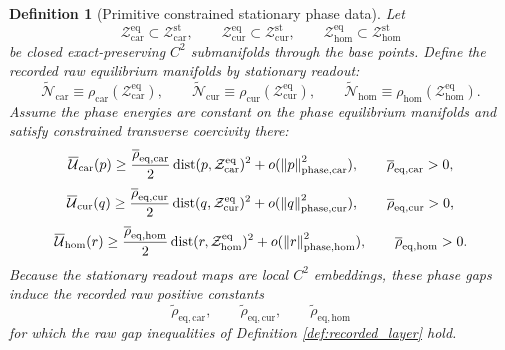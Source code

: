 \documentclass[11pt]{article}
\newcommand{\TensorRawEqManifold}{\widetilde{\mathcal N}_{\mathrm{car}}}
\newcommand{\CurRawEqManifold}{\widetilde{\mathcal N}_{\mathrm{cur}}}
\newcommand{\HomRawEqManifold}{\widetilde{\mathcal N}_{\mathrm{hom}}}
\newcommand{\RawCarGap}{\widetilde\rho_{\mathrm{eq,car}}}
\newcommand{\RawCurGap}{\widetilde\rho_{\mathrm{eq,cur}}}
\newcommand{\RawHomGap}{\widetilde\rho_{\mathrm{eq,hom}}}
\newcommand{\TensorPhaseRead}{\rho_{\mathrm{car}}}
\newcommand{\CurPhaseRead}{\rho_{\mathrm{cur}}}
\newcommand{\HomPhaseRead}{\rho_{\mathrm{hom}}}
\newcommand{\TensorPhaseEnergy}{\overline{\mathcal U}_{\mathrm{car}}}
\newcommand{\CurPhaseEnergy}{\overline{\mathcal U}_{\mathrm{cur}}}
\newcommand{\HomPhaseEnergy}{\overline{\mathcal U}_{\mathrm{hom}}}
\newcommand{\TensorStationaryManifold}{\mathcal Z_{\mathrm{car}}^{\mathrm{st}}}
\newcommand{\CurStationaryManifold}{\mathcal Z_{\mathrm{cur}}^{\mathrm{st}}}
\newcommand{\HomStationaryManifold}{\mathcal Z_{\mathrm{hom}}^{\mathrm{st}}}
\newcommand{\TensorPhaseEqManifold}{\mathcal Z_{\mathrm{car}}^{\mathrm{eq}}}
\newcommand{\CurPhaseEqManifold}{\mathcal Z_{\mathrm{cur}}^{\mathrm{eq}}}
\newcommand{\HomPhaseEqManifold}{\mathcal Z_{\mathrm{hom}}^{\mathrm{eq}}}
\newcommand{\PhaseCarGap}{\overline\rho_{\mathrm{eq,car}}}
\newcommand{\PhaseCurGap}{\overline\rho_{\mathrm{eq,cur}}}
\newcommand{\PhaseHomGap}{\overline\rho_{\mathrm{eq,hom}}}
\newtheorem{definition}{Definition}
\begin{document}
\begin{definition}[Primitive constrained stationary phase data]
Let
\[
\TensorPhaseEqManifold\subset\TensorStationaryManifold,\qquad
\CurPhaseEqManifold\subset\CurStationaryManifold,\qquad
\HomPhaseEqManifold\subset\HomStationaryManifold
\]
be closed exact-preserving \(C^2\) submanifolds through the base points. Define the recorded raw equilibrium manifolds by stationary readout:
\begin{equation}
\TensorRawEqManifold\equiv\TensorPhaseRead(\TensorPhaseEqManifold),\qquad
\CurRawEqManifold\equiv\CurPhaseRead(\CurPhaseEqManifold),\qquad
\HomRawEqManifold\equiv\HomPhaseRead(\HomPhaseEqManifold).
\label{eq:raw_eq_manifold_from_phase}
\end{equation}
Assume the phase energies are constant on the phase equilibrium manifolds and satisfy constrained transverse coercivity there:
\begin{equation}
\TensorPhaseEnergy(p)
\ge
\frac{\PhaseCarGap}{2}\operatorname{dist}(p,\TensorPhaseEqManifold)^2
+o(\norm{p}_{\mathrm{phase,car}}^2),
\qquad
\PhaseCarGap>0,
\label{eq:phase_gap_car}
\end{equation}
\begin{equation}
\CurPhaseEnergy(q)
\ge
\frac{\PhaseCurGap}{2}\operatorname{dist}(q,\CurPhaseEqManifold)^2
+o(\norm{q}_{\mathrm{phase,cur}}^2),
\qquad
\PhaseCurGap>0,
\label{eq:phase_gap_cur}
\end{equation}
\begin{equation}
\HomPhaseEnergy(r)
\ge
\frac{\PhaseHomGap}{2}\operatorname{dist}(r,\HomPhaseEqManifold)^2
+o(\norm{r}_{\mathrm{phase,hom}}^2),
\qquad
\PhaseHomGap>0.
\label{eq:phase_gap_hom}
\end{equation}
Because the stationary readout maps are local \(C^2\) embeddings, these phase gaps induce the recorded raw positive constants
\[
\RawCarGap,\qquad
\RawCurGap,\qquad
\RawHomGap
\]
for which the raw gap inequalities of Definition \ref{def:recorded_layer} hold.
\end{definition}
\end{document}
